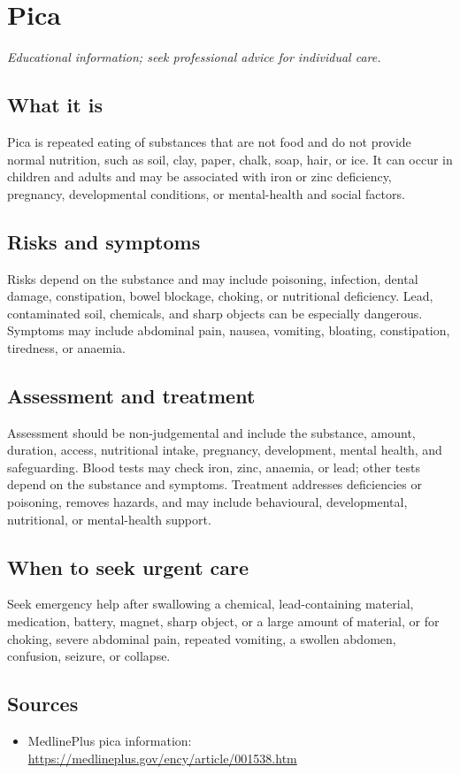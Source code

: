 \chapter{Pica}

\medskip
\noindent\textit{Educational information; seek professional advice for individual care.}

\section*{What it is}
Pica is repeated eating of substances that are not food and do not provide normal nutrition, such as soil, clay, paper, chalk, soap, hair, or ice. It can occur in children and adults and may be associated with iron or zinc deficiency, pregnancy, developmental conditions, or mental-health and social factors.

\section*{Risks and symptoms}
Risks depend on the substance and may include poisoning, infection, dental damage, constipation, bowel blockage, choking, or nutritional deficiency. Lead, contaminated soil, chemicals, and sharp objects can be especially dangerous. Symptoms may include abdominal pain, nausea, vomiting, bloating, constipation, tiredness, or anaemia.

\section*{Assessment and treatment}
Assessment should be non-judgemental and include the substance, amount, duration, access, nutritional intake, pregnancy, development, mental health, and safeguarding. Blood tests may check iron, zinc, anaemia, or lead; other tests depend on the substance and symptoms. Treatment addresses deficiencies or poisoning, removes hazards, and may include behavioural, developmental, nutritional, or mental-health support.

\section*{When to seek urgent care}
Seek emergency help after swallowing a chemical, lead-containing material, medication, battery, magnet, sharp object, or a large amount of material, or for choking, severe abdominal pain, repeated vomiting, a swollen abdomen, confusion, seizure, or collapse.

\section*{Sources}
\begin{itemize}
\item MedlinePlus pica information: \url{https://medlineplus.gov/ency/article/001538.htm}
\end{itemize}
